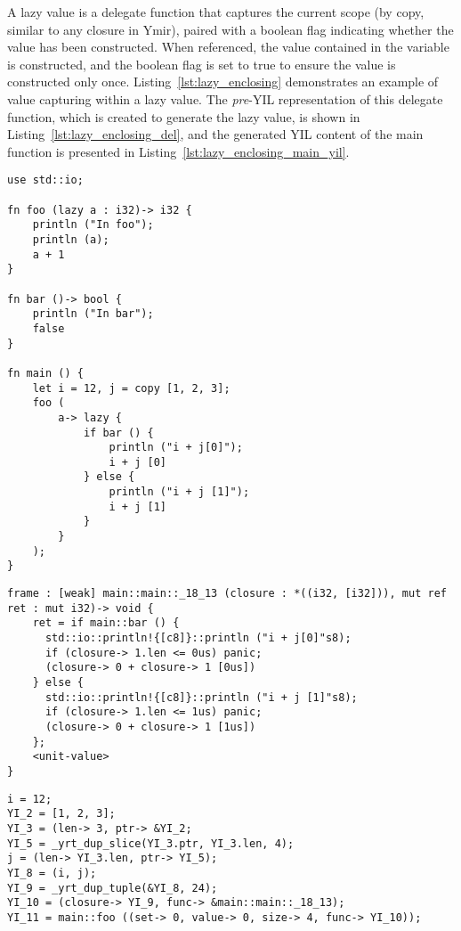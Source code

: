A lazy value is a delegate function that captures the current scope (by copy,
similar to any closure in Ymir), paired with a boolean flag indicating whether
the value has been constructed. When referenced, the value contained in the
variable is constructed, and the boolean flag is set to true to ensure the value
is constructed only once. Listing~\ref{lst:lazy_enclosing} demonstrates an
example of value capturing within a lazy value. The \textit{pre}-YIL
representation of this delegate function, which is created to generate the lazy
value, is shown in Listing~\ref{lst:lazy_enclosing_del}, and the generated YIL
content of the main function is presented in
Listing~\ref{lst:lazy_enclosing_main_yil}.

\begin{lstlisting}[style=coloredverbatim, caption=Lazy value enclosing variables, label=lst:lazy_enclosing]
use std::io;

fn foo (lazy a : i32)-> i32 {
    println ("In foo");
    println (a);
    a + 1
}

fn bar ()-> bool {
    println ("In bar");
    false
}

fn main () {
    let i = 12, j = copy [1, 2, 3];
    foo (
        a-> lazy {
            if bar () {
                println ("i + j[0]");
                i + j [0]
            } else {
                println ("i + j [1]");
                i + j [1]
            }
        }
    );
}
\end{lstlisting}

\begin{lstlisting}[style=intermediateVerb, caption=\textit{pre}-YIL representation of lazy value enclosing \token{i} and \token{j}, label=lst:lazy_enclosing_del]
frame : [weak] main::main::_18_13 (closure : *((i32, [i32])), mut ref ret : mut i32)-> void {
    ret = if main::bar () {
      std::io::println!{[c8]}::println ("i + j[0]"s8);
      if (closure-> 1.len <= 0us) panic;
      (closure-> 0 + closure-> 1 [0us])
    } else {
      std::io::println!{[c8]}::println ("i + j [1]"s8);
      if (closure-> 1.len <= 1us) panic;
      (closure-> 0 + closure-> 1 [1us])
    };
    <unit-value>
}
\end{lstlisting}

\begin{lstlisting}[style=intermediateVerb, caption=YIL representation of the main function constructing the lazy value, label=lst:lazy_enclosing_main_yil]
i = 12;
YI_2 = [1, 2, 3];
YI_3 = (len-> 3, ptr-> &YI_2;
YI_5 = _yrt_dup_slice(YI_3.ptr, YI_3.len, 4);
j = (len-> YI_3.len, ptr-> YI_5);
YI_8 = (i, j);
YI_9 = _yrt_dup_tuple(&YI_8, 24);
YI_10 = (closure-> YI_9, func-> &main::main::_18_13);
YI_11 = main::foo ((set-> 0, value-> 0, size-> 4, func-> YI_10));
\end{lstlisting}

